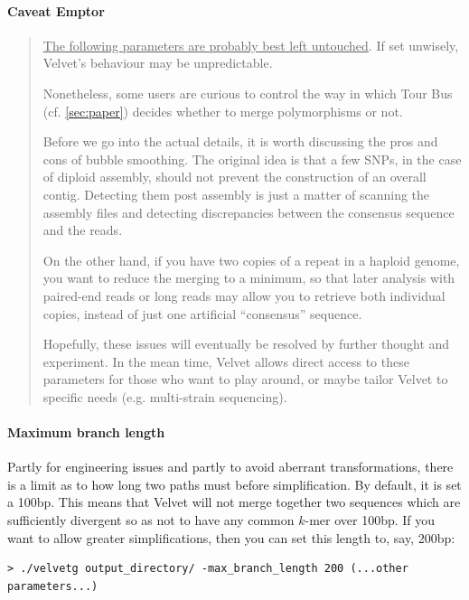 \documentclass{article}
\begin{document}
\paragraph{Caveat Emptor}
\begin{quotation}
\underline{The following parameters are probably best left untouched}. If set unwisely, Velvet's behaviour may be unpredictable. 

Nonetheless, some users are curious to control the way in which Tour Bus (cf. \ref{sec:paper}) decides whether to merge polymorphisms or not.

Before we go into the actual details, it is worth discussing the pros and cons of bubble smoothing. The original idea is that a few SNPs, in the case of diploid assembly, should not prevent the construction of an overall contig. Detecting them post assembly is just a matter of scanning the assembly files and detecting discrepancies between the consensus sequence and the reads.  

On the other hand, if you have two copies of a repeat in a haploid genome, you want to reduce the merging to a minimum, so that later analysis with paired-end reads or long reads may allow you to retrieve both individual copies, instead of just one artificial ``consensus'' sequence.

Hopefully, these issues will eventually be resolved by further thought and experiment. In the mean time, Velvet allows direct access to these parameters for those who want to play around, or maybe tailor Velvet to specific needs (e.g. multi-strain sequencing). 
\end{quotation}

\paragraph{Maximum branch length}

Partly for engineering issues and partly to avoid aberrant transformations, there is a limit as to how long two paths must before simplification. By default, it is set a 100bp. This means that Velvet will not merge together two sequences which are sufficiently divergent so as not to have any common $k$-mer over 100bp. If you want to allow greater simplifications, then you can set this length to, say, 200bp:

\begin{verbatim}
> ./velvetg output_directory/ -max_branch_length 200 (...other parameters...)
\end{verbatim} 
\end{document}

